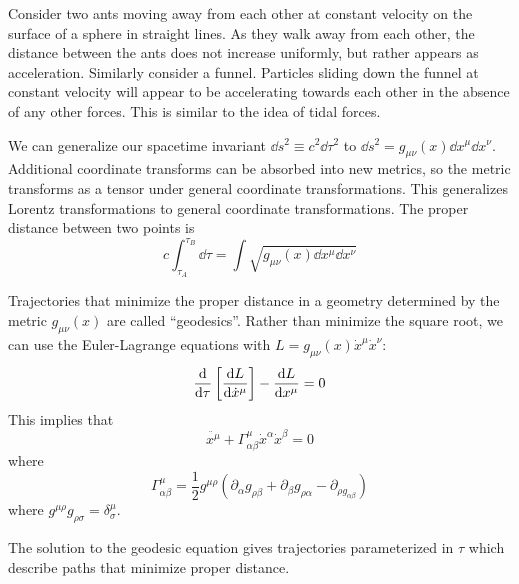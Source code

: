 \documentclass[a4paper,twoside,master.tex]{subfiles}
\begin{document}
Consider two ants moving away from each other at constant velocity on the surface of a sphere in straight lines. As they walk away from each other, the distance between the ants does not increase uniformly, but rather appears as acceleration. Similarly consider a funnel. Particles sliding down the funnel at constant velocity will appear to be accelerating towards each other in the absence of any other forces. This is similar to the idea of tidal forces.

We can generalize our spacetime invariant $ \dd{s^2} \equiv c^2 \dd{\tau^2} $ to $ \dd{s^2} = g_{\mu \nu}(x) \dd{x^{\mu}} \dd{x^{\nu}} $. Additional coordinate transforms can be absorbed into new metrics, so the metric transforms as a tensor under general coordinate transformations. This generalizes Lorentz transformations to general coordinate transformations. The proper distance between two points is
\begin{equation}
    c \int_{\tau_A}^{\tau_B} \dd{\tau} = \int \sqrt{g_{\mu \nu}(x) \dd{x^{\mu}} \dd{x^{\nu}}}
\end{equation}

Trajectories that minimize the proper distance in a geometry determined by the metric $ g_{\mu \nu}(x) $ are called ``geodesics''. Rather than minimize the square root, we can use the Euler-Lagrange equations with $ L = g_{\mu \nu}(x) \dot{x}^{\mu} \dot{x}^{\nu} $:
\begin{equation}
    \dv{\tau}\left[ \dv{L}{\dot{x}^{\mu}} \right] - \dv{L}{x^{\mu}} = 0
\end{equation}
This implies that
\begin{equation}
    \ddot{x^{\mu}} + \Gamma^{\mu}_{\alpha \beta} \dot{x}^{\alpha} \dot{x}^{\beta} = 0 \tag{Geodesic Equation}
\end{equation}
where
\begin{equation}
    \Gamma^{\mu}_{\alpha \beta} = \frac{1}{2} g^{\mu \rho} \left( \partial_{\alpha} g_{\rho \beta} + \partial_{\beta} g_{\rho \alpha} - \partial_{\rho g_{\alpha \beta}} \right) \tag{Christoffel Symbols}
\end{equation}
where $ g^{\mu \rho} g_{\rho \sigma} = \delta^{\mu}_{\sigma} $.

The solution to the geodesic equation gives trajectories parameterized in $ \tau $ which describe paths that minimize proper distance.
\end{document}
